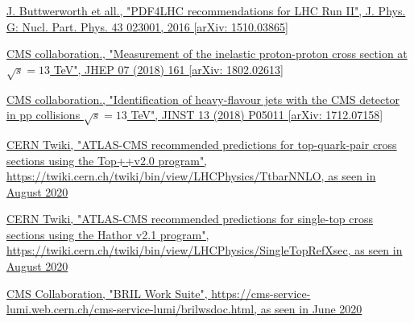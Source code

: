 \documentclass[a4paper, 10pt, openright]{report}
\begin{document}
\begin{thebibliography}{1}
\href{https://arxiv.org/abs/1510.03865}{J. Buttwerworth et all.,
"PDF4LHC recommendations for LHC Run II", J. Phys. G: Nucl. Part. Phys. 43 023001, 2016 [arXiv: 1510.03865]}

\href{https://arxiv.org/abs/1802.02613}{CMS collaboration.,
"Measurement of the inelastic proton-proton cross section at $\sqrt{s} = 13$ TeV", 	JHEP 07 (2018) 161 [arXiv: 1802.02613]}

\href{https://arxiv.org/abs/1712.07158}{CMS collaboration.,
"Identification of heavy-flavour jets with the CMS detector in pp collisions $\sqrt{s} = 13$ TeV", 		JINST 13 (2018) P05011 [arXiv: 1712.07158]}

\href{https://twiki.cern.ch/twiki/bin/view/LHCPhysics/TtbarNNLO}{CERN Twiki,
"ATLAS-CMS recommended predictions for top-quark-pair cross sections using the Top++v2.0 program", \url{https://twiki.cern.ch/twiki/bin/view/LHCPhysics/TtbarNNLO}, as seen in August 2020}

\href{https://twiki.cern.ch/twiki/bin/view/LHCPhysics/SingleTopRefXsec}{CERN Twiki, 
"ATLAS-CMS recommended predictions for single-top cross sections using the Hathor v2.1 program",
\url{https://twiki.cern.ch/twiki/bin/view/LHCPhysics/SingleTopRefXsec}, as seen in August 2020}


\href{https://cms-service-lumi.web.cern.ch/cms-service-lumi/brilwsdoc.html}{CMS Collaboration,
"BRIL Work Suite", \url{https://cms-service-lumi.web.cern.ch/cms-service-lumi/brilwsdoc.html}, as seen in June 2020}

\end{thebibliography}
\end{document}
